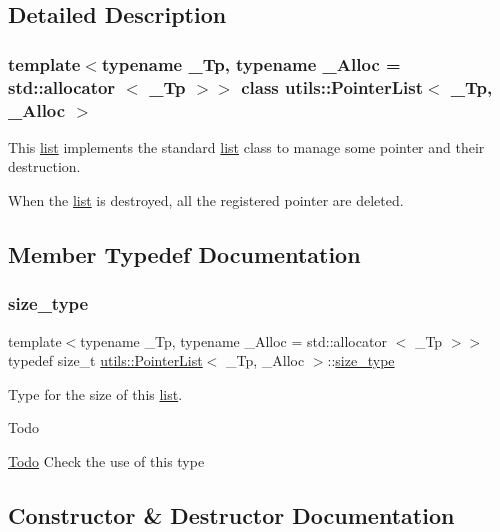 \subsection{Detailed Description}
\subsubsection*{template$<$typename \+\_\+\+Tp, typename \+\_\+\+Alloc = std\+::allocator $<$ \+\_\+\+Tp $>$$>$\newline
class utils\+::\+Pointer\+List$<$ \+\_\+\+Tp, \+\_\+\+Alloc $>$}

This \hyperlink{protocollist-p}{list} implements the standard \hyperlink{protocollist-p}{list} class to manage some pointer and their destruction. 

When the \hyperlink{protocollist-p}{list} is destroyed, all the registered pointer are deleted. 

\subsection{Member Typedef Documentation}
\mbox{\label{classutils_1_1PointerList_a8d7b485e236a01cc14b41694ae0b3456}} 
\subsubsection{\texorpdfstring{size\+\_\+type}{size\_type}}
{\footnotesize\ttfamily template$<$typename \+\_\+\+Tp, typename \+\_\+\+Alloc = std\+::allocator $<$ \+\_\+\+Tp $>$$>$ \\
typedef size\+\_\+t \hyperlink{classutils_1_1PointerList}{utils\+::\+Pointer\+List}$<$ \+\_\+\+Tp, \+\_\+\+Alloc $>$\+::\hyperlink{classutils_1_1PointerList_a8d7b485e236a01cc14b41694ae0b3456}{size\+\_\+type}}



Type for the size of this \hyperlink{protocollist-p}{list}. 

\begin{DoxyRefDesc}{Todo}
\item[\hyperlink{todo__todo000001}{Todo}]Check the use of this type \end{DoxyRefDesc}


\subsection{Constructor \& Destructor Documentation}
\mbox{\label{classutils_1_1PointerList_aabad19d5a33c52b25ea3c7ff65fff4bd}} 
